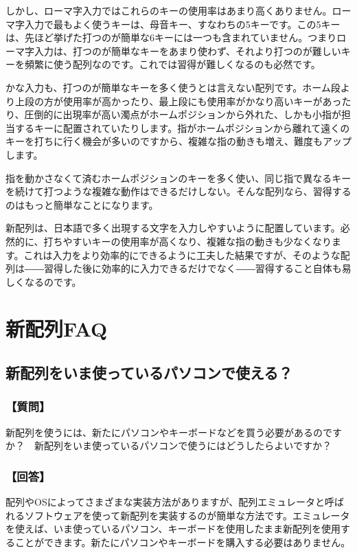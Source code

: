 しかし、ローマ字入力ではこれらのキーの使用率はあまり高くありません。ローマ字入力で最もよく使うキーは、母音キー、すなわちの5キーです。この5キーは、先ほど挙げた打つのが簡単な6キーには一つも含まれていません。つまりローマ字入力は、打つのが簡単なキーをあまり使わず、それより打つのが難しいキーを頻繁に使う配列なのです。これでは習得が難しくなるのも必然です。

かな入力も、打つのが簡単なキーを多く使うとは言えない配列です。ホーム段より上段の方が使用率が高かったり、最上段にも使用率がかなり高いキーがあったり、圧倒的に出現率が高い濁点がホームポジションから外れた、しかも小指が担当するキーに配置されていたりします。指がホームポジションから離れて遠くのキーを打ちに行く機会が多いのですから、複雑な指の動きも増え、難度もアップします。

指を動かさなくて済むホームポジションのキーを多く使い、同じ指で異なるキーを続けて打つような複雑な動作はできるだけしない。そんな配列なら、習得するのはもっと簡単なことになります。

新配列は、日本語で多く出現する文字を入力しやすいように配置しています。必然的に、打ちやすいキーの使用率が高くなり、複雑な指の動きも少なくなります。これは入力をより効率的にできるように工夫した結果ですが、そのような配列は――習得した後に効率的に入力できるだけでなく――習得すること自体も易しくなるのです。

\section{新配列FAQ}

\subsection{新配列をいま使っているパソコンで使える？}

\subsubsection*{【質問】}

新配列を使うには、新たにパソコンやキーボードなどを買う必要があるのですか？　新配列をいま使っているパソコンで使うにはどうしたらよいですか？

\subsubsection*{【回答】}

配列やOSによってさまざまな実装方法がありますが、配列エミュレータと呼ばれるソフトウェアを使って新配列を実装するのが簡単な方法です。エミュレータを使えば、いま使っているパソコン、キーボードを使用したまま新配列を使用することができます。新たにパソコンやキーボードを購入する必要はありません。

